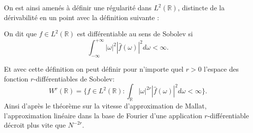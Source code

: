 On est ainsi amenés à définir une régularité dans $L^2(\mathbb{R})$, distincte de la dérivabilité en un point avec la définition suivante :
\begin{definition}
	On dit que $f\in L^2(\mathbb{R})$ est différentiable au sens de Sobolev si
	\begin{equation*}
		\int_{-\infty}^{+\infty} |\omega|^2|\hat{f}(\omega)|^2 d\omega < \infty. 
	\end{equation*}
\end{definition}
Et avec cette définition on peut définir pour n'importe quel $r>0$ l'espace des fonction $r$-différentiables de Sobolev:
\begin{equation}
	W^r(\mathbb{R}) =\{ f \in L^2(\mathbb{R}) : \int_{\mathbb{R}} |\omega|^{2r} |\hat{f}(\omega)|^2 d\omega < \infty \}.
\end{equation}
Ainsi d'après le théorème sur la vitesse d'approximation de Mallat, l'approximation linéaire dans la base de Fourier d'une application $r$-différentiable décroit plus vite que $N^{-2r}$.

